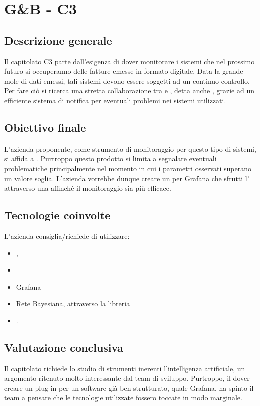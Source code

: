 \section{G\&B - C3} \label{c3}
    \subsection{Descrizione generale}
    Il capitolato C3 parte dall'esigenza di dover monitorare i sistemi che nel prossimo futuro si occuperanno delle fatture emesse in formato digitale.
    Data la grande mole di dati emessi, tali sistemi devono essere soggetti ad un continuo controllo. Per fare ciò si ricerca una stretta collaborazione
    tra  e , detta anche , grazie ad un efficiente sistema di notifica per eventuali problemi nei sistemi utilizzati.

    \subsection{Obiettivo finale}
    L'azienda proponente, come strumento di monitoraggio per questo tipo di sistemi, si affida a . Purtroppo questo prodotto si limita a
    segnalare eventuali problematiche principalmente nel momento in cui i parametri osservati superano un valore soglia. L'azienda vorrebbe dunque creare un 
    per Grafana che sfrutti l' attraverso una  affinché il monitoraggio sia più efficace.

    \subsection{Tecnologie coinvolte}
    L'azienda consiglia/richiede di utilizzare:
    \begin{itemize}
    	\item {}, 
    	\item {}
    	\item Grafana
    	\item Rete Bayesiana, attraverso la libreria 
    	\item {}.
    \end{itemize}

    \subsection{Valutazione conclusiva}
    Il capitolato richiede lo studio di strumenti inerenti l'intelligenza artificiale, un argomento ritenuto molto interessante dal team di sviluppo.
    Purtroppo, il dover creare un plug-in per un software già ben strutturato, quale Grafana, ha spinto il team a pensare che le tecnologie utilizzate fossero
    toccate in modo marginale.

